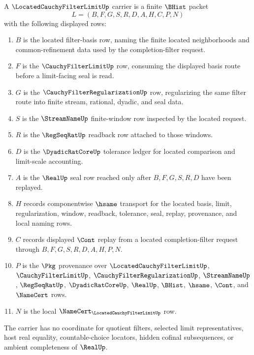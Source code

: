 \begin{definition}
\label{def:located-cauchy-filter-limit-carrier}
A $\LocatedCauchyFilterLimitUp$ carrier is a finite $\BHist$ packet
$$
L=(B,F,G,S,R,D,A,H,C,P,N)
$$
with the following displayed rows:
\begin{enumerate}
\item $B$ is the located filter-basis row, naming the finite located neighborhoods and common-refinement data used by the completion-filter request.
\item $F$ is the $\CauchyFilterLimitUp$ row, consuming the displayed basis route before a limit-facing seal is read.
\item $G$ is the $\CauchyFilterRegularizationUp$ row, regularizing the same filter route into finite stream, rational, dyadic, and seal data.
\item $S$ is the $\StreamNameUp$ finite-window row inspected by the located request.
\item $R$ is the $\RegSeqRatUp$ readback row attached to those windows.
\item $D$ is the $\DyadicRatCoreUp$ tolerance ledger for located comparison and limit-scale accounting.
\item $A$ is the $\RealUp$ seal row reached only after $B,F,G,S,R,D$ have been replayed.
\item $H$ records componentwise $\hsame$ transport for the located basis, limit, regularization, window, readback, tolerance, seal, replay, provenance, and local naming rows.
\item $C$ records displayed $\Cont$ replay from a located completion-filter request through $B,F,G,S,R,D,A,H,P,N$.
\item $P$ is the $\Pkg$ provenance over $\LocatedCauchyFilterLimitUp$, $\CauchyFilterLimitUp$, $\CauchyFilterRegularizationUp$, $\StreamNameUp$, $\RegSeqRatUp$, $\DyadicRatCoreUp$, $\RealUp$, $\BHist$, $\hsame$, $\Cont$, and $\NameCert$ rows.
\item $N$ is the local $\NameCert_{\LocatedCauchyFilterLimitUp}$ row.
\end{enumerate}
The carrier has no coordinate for quotient filters, selected limit representatives, host real equality, countable-choice locators, hidden cofinal subsequences, or ambient completeness of $\RealUp$.
\end{definition}

